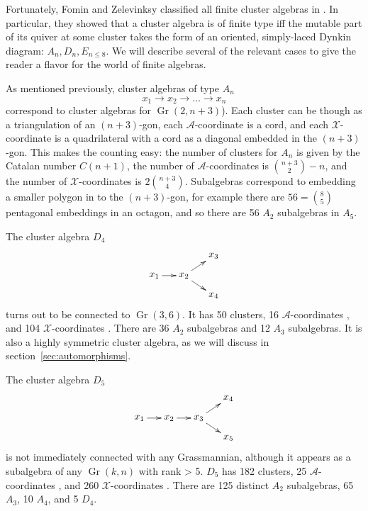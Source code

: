 \documentclass[11pt]{article}
\DeclareMathOperator{\Gr}{Gr}
\def\xcoord{$\mathcal{X}$-coordinate }
\def\xcoords{$\mathcal{X}$-coordinates }
\def\acoord{$\mathcal{A}$-coordinate }
\def\acoords{$\mathcal{A}$-coordinates }
\begin{document}
Fortunately, Fomin and Zelevinksy classified all finite cluster algebras in \cite{1054.17024}. In particular, they showed that a cluster algebra is of finite type iff the mutable part of its quiver at some cluster takes the form of an oriented, simply-laced Dynkin diagram: $A_n, D_n, E_{n\le8}$. We will describe several of the relevant cases to give the reader a flavor for the world of finite algebras. 

As mentioned previously, cluster algebras of type $A_n$
\begin{equation}\label{def:An}
  x_1\to x_2\to \ldots \to x_n
\end{equation}
correspond to cluster algebras for $\Gr(2,n{+}3)$). Each cluster can be though as a triangulation of an $(n+3)$-gon, each \acoord is a cord, and each \xcoord is a quadrilateral with a cord as a diagonal embedded in the $(n+3)$-gon. This makes the counting easy: the number of clusters for $A_n$ is given by the Catalan number $C(n+1)$, the number of \acoords is $\binom{n+3}{2}-n$, and the number of \xcoords is $2\binom{n+3}{4}$. Subalgebras correspond to embedding a smaller polygon in to the $(n+3)$-gon, for example there are $56=\binom{8}{5}$ pentagonal embeddings in an octagon, and so there are 56 $A_2$ subalgebras in $A_5$. 

The cluster algebra $D_4$
\begin{equation}\label{def:D4}
    \begin{gathered}
    \begin{xy} 0;<1pt,0pt>:<0pt,-1pt>::
      (0,20) *+{x_1} ="1",
      (30,20) *+{x_2} ="2",
      (60,0) *+{x_3} ="3",
      (60,40) *+{x_4} ="4",
      "1", {\ar"2"},
      "2", {\ar"3"},
      "2", {\ar"4"},
    \end{xy}
    \end{gathered}
\end{equation}
turns out to be connected to $\Gr(3,6)$. It has 50 clusters, 16 \acoords, and 104 \xcoords. There are 36 $A_2$ subalgebras and 12 $A_3$ subalgebras. It is also a highly symmetric cluster algebra, as we will discuss in section~\ref{sec:automorphisms}.

The cluster algebra $D_5$
\begin{equation}\label{def:D5}
    \begin{gathered}
    \begin{xy} 0;<1pt,0pt>:<0pt,-1pt>::
      (0,20) *+{x_1} ="1",
      (30,20) *+{x_2} ="2",
      (60,20) *+{x_3} ="3",
      (90,0) *+{x_4} ="4",
      (90,40) *+{x_5} ="5",
      "1", {\ar"2"},
      "2", {\ar"3"},
      "3", {\ar"4"},
      "3", {\ar"5"},
    \end{xy}
    \end{gathered}
\end{equation}
is not immediately connected with any Grassmannian, although it appears as a subalgebra of any $\Gr(k,n)$ with rank > 5. $D_5$ has 182 clusters, 25 \acoords, and 260 \xcoords. There are 125 distinct $A_2$ subalgebras, 65 $A_3$, 10 $A_4$, and 5 $D_4$. 
\end{document}
